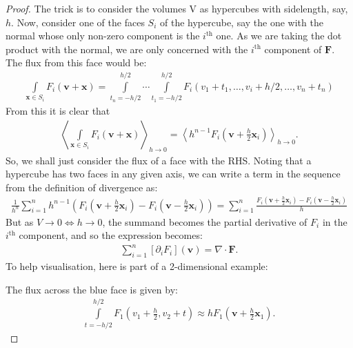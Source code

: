 \documentclass{article}
\theoremstyle{definition}
\begin{document}
\begin{proof}
	The trick is to consider the volumes V as hypercubes with sidelength, say, $h$.
	Now, consider one of the faces $S_i$ of the hypercube, say the one with the normal whose only non-zero component is the $i^\text{th}$ one. As we are taking the dot product with the normal, we are only concerned with the $i^\text{th}$ component of $\mathbf{F}$. The flux from this face would be:
	\begin{align*}
		\int\limits_{\mathbf{x}\in S_i}F_i(\mathbf{v+\mathbf{x}})=\int\limits_{t_n=-h/2}^{h/2}\cdots\int\limits_{t_1=-h/2}^{h/2}F_i(v_1+t_1,\dots,v_i+h/2,\dots,v_n+t_n)
	\end{align*}
	From this it is clear that
	\begin{align*}
		\left\langle\int\limits_{\mathbf{x}\in S_i}F_i(\mathbf{v+\mathbf{x}})\right\rangle_{h\rightarrow0}=\left\langle h^{n-1}F_i(\mathbf{v}+\frac{h}{2}\mathbf{x}_i)\right\rangle_{h\rightarrow0}.
	\end{align*}
	So, we shall just consider the flux of a face with the RHS. Noting that a hypercube has two faces in any given axis, we can write a term in the sequence from the definition of divergence as:
	\begin{align*}
		\frac{1}{h^n}\sum_{i=1}^{n}h^{n-1}\left(F_i(\mathbf{v}+\frac{h}{2}\mathbf{x}_i)-F_i(\mathbf{v}-\frac{h}{2}\mathbf{x}_i)\right)=\sum_{i=1}^{n}\frac{F_i(\mathbf{v}+\frac{h}{2}\mathbf{x}_i)-F_i(\mathbf{v}-\frac{h}{2}\mathbf{x}_i)}{h}
	\end{align*}
	But as $V\rightarrow0\iff h\rightarrow0$, the summand becomes the partial derivative of $F_i$ in the $i^\text{th}$ component, and so the expression becomes:
	\begin{align*}
		\sum_{i=1}^{n}[\partial_iF_i](\mathbf{v})=\nabla\cdot\mathbf{F}.
	\end{align*}
	To help visualisation, here is part of a 2-dimensional example:
	\begin{center}
	\end{center}
	The flux across the blue face is given by:
	\begin{align*}
		\int\limits_{t=-h/2}^{h/2}F_1(v_1+\frac{h}{2},v_2+t)\approx hF_1(\mathbf{v}+\frac{h}{2}\mathbf{x}_1).
	\end{align*}
\end{proof}
\end{document}
